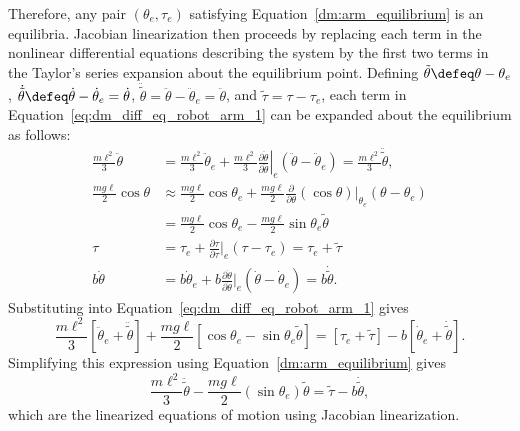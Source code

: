 Therefore, any pair $(\theta_e, \tau_e)$ satisfying Equation~\eqref{dm:arm_equilibrium} is an equilibria.  
Jacobian linearization then proceeds by replacing each term in the nonlinear differential equations describing the system by the first two terms in the Taylor's series expansion about the equilibrium point.  
Defining $\tilde{\theta}\defeq\theta-\theta_e$, $\dot{\tilde{\theta}}\defeq\dot{\theta}-\dot{\theta}_e=\dot{\theta}$, $\ddot{\tilde{\theta}}=\ddot{\theta}-\ddot{\theta}_e=\ddot{\theta}$, and $\tilde{\tau}=\tau-\tau_e$, each term in Equation~\eqref{eq:dm_diff_eq_robot_arm_1} can be expanded about the equilibrium as follows:
\begin{align*}
\frac{m\ell^2}{3}\ddot{\theta} &= \frac{m\ell^2}{3}\ddot{\theta}_e + \frac{m\ell^2}{3}\left.\frac{\partial \ddot{\theta}}{\partial \ddot{\theta}}\right|_e (\ddot{\theta}-\ddot{\theta}_e) = \frac{m\ell^2}{3} \ddot{\tilde{\theta}}, \\
\frac{mg\ell}{2}\cos\theta &\approx \frac{mg\ell}{2} \cos\theta_e + \frac{mg\ell}{2}\frac{\partial}{\partial \theta}
(\cos\theta)\Big|_{\theta_e} 
(\theta-\theta_e) \\
&= \frac{mg\ell}{2}\cos\theta_e - \frac{mg\ell}{2}\sin\theta_e \tilde{\theta} \\
\tau &= \tau_e + \frac{\partial \tau}{\partial \tau}\Big|_e (\tau-\tau_e)
     = \tau_e + \tilde{\tau} \\
b\dot{\theta} &= b\dot{\theta}_e + b\frac{\partial \dot{\theta}}{\partial \dot{\theta}}\Big|_e (\dot{\theta}-\dot{\theta}_e) = b\dot{\tilde{\theta}}.  
\end{align*}
Substituting into Equation~\eqref{eq:dm_diff_eq_robot_arm_1} gives
\[
\frac{m\ell^2}{3}\left[\ddot{\theta}_e + \ddot{\tilde{\theta}}\right] + \frac{mg\ell}{2}\left[\cos\theta_e - \sin\theta_e\tilde{\theta}\right] = \left[\tau_e+\tilde{\tau}\right] - b\left[\dot{\theta}_e +\dot{\tilde{\theta}}\right].
\]
Simplifying this expression using Equation~\eqref{dm:arm_equilibrium} gives
\begin{equation}\label{eq:arm_linearized_eom_jacobian}
\frac{m\ell^2}{3}\ddot{\tilde{\theta}} - \frac{mg\ell}{2}(\sin\theta_e)\tilde{\theta} = \tilde{\tau} - b\dot{\tilde{\theta}},
\end{equation}
which are the linearized equations of motion using Jacobian linearization.

